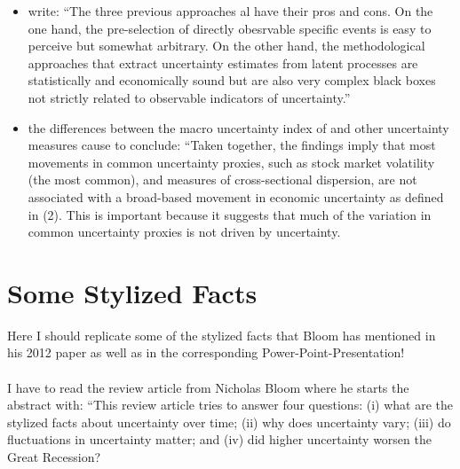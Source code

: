 \documentclass[a4paper,12pt,oneside,pointednumbers,bibtotoc,bigheadings,liststotoc]{scrbook}
\begin{document}
\begin{itemize}
	\item \citet[p. 3]{bontempietal:16} write: ``The three previous approaches al have their pros and cons. On the one hand, the pre-selection of directly obesrvable specific events is easy to perceive but somewhat arbitrary. On the other hand, the methodological approaches that extract uncertainty estimates from latent processes are statistically and economically sound but are also very complex black boxes not strictly related to observable indicators of uncertainty.''
	\item the differences between the macro uncertainty index of \citet{juradoetal:15} and other uncertainty measures cause \citet[p. 1180]{juradoetal:15} to conclude: ``Taken together, the findings imply that most movements in common uncertainty proxies, such as stock market volatility (the most common), and measures of cross-sectional dispersion, are not associated with a broad-based movement in economic uncertainty as defined in (2). This is important because it suggests that much of the variation in common uncertainty proxies is not driven by uncertainty.
\end{itemize}
\endgroup



\section{Some Stylized Facts}
Here I should replicate some of the stylized facts that Bloom has mentioned in his 2012 paper as well as in the corresponding Power-Point-Presentation!\\
\\
I have to read the review article from Nicholas Bloom where he starts the abstract with: ``This review article tries to answer four questions: (i) what are the stylized facts about uncertainty over time; (ii) why does uncertainty vary; (iii) do fluctuations in uncertainty matter; and (iv) did higher uncertainty worsen the Great Recession?



\end{document}
